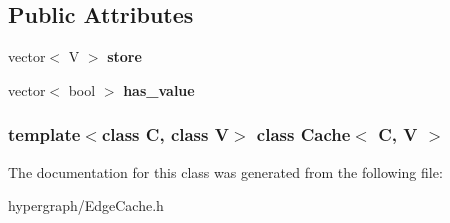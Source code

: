 \subsection*{Public Attributes}
\begin{DoxyCompactItemize}
\item 
\hypertarget{classCache_a4de9009630d4bdc7e78b9db7ea734411}{
vector$<$ V $>$ {\bfseries store}}
\label{classCache_a4de9009630d4bdc7e78b9db7ea734411}

\item 
\hypertarget{classCache_a30fcdd51d6ff0cd602cc23d4a12b5348}{
vector$<$ bool $>$ {\bfseries has\_\-value}}
\label{classCache_a30fcdd51d6ff0cd602cc23d4a12b5348}

\end{DoxyCompactItemize}
\subsubsection*{template$<$class C, class V$>$ class Cache$<$ C, V $>$}



The documentation for this class was generated from the following file:\begin{DoxyCompactItemize}
\item 
hypergraph/EdgeCache.h\end{DoxyCompactItemize}
